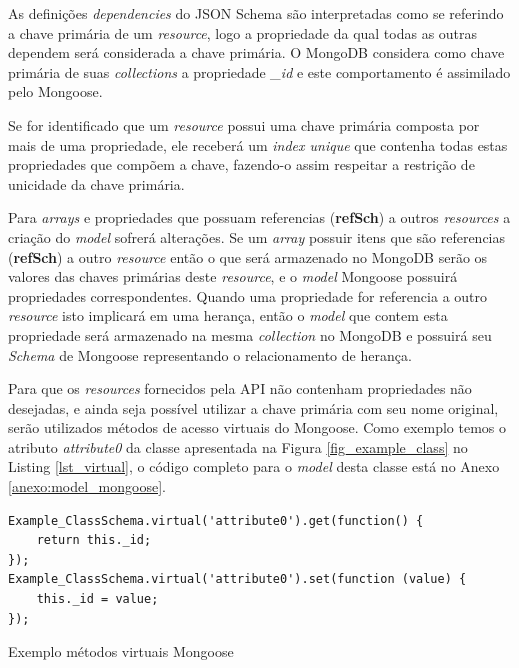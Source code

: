As definições \textit{dependencies} do JSON Schema são interpretadas como se referindo a chave primária de um \textit{resource}, logo a propriedade da qual todas as outras dependem será considerada a chave primária. O MongoDB considera como chave primária de suas \textit{collections} a propriedade \textit{\_id} e este comportamento é assimilado pelo Mongoose.

Se for identificado que um \textit{resource} possui uma chave primária composta por mais de uma propriedade, ele receberá um \textit{index unique} que contenha todas estas propriedades que compõem a chave, fazendo-o assim respeitar a restrição de unicidade da chave primária.

Para \textit{arrays} e propriedades que possuam referencias (\textbf{refSch}) a outros \textit{resources} a criação do \textit{model} sofrerá alterações. Se um \textit{array} possuir itens que são referencias (\textbf{refSch}) a outro \textit{resource} então o que será armazenado no MongoDB serão os valores das chaves primárias deste \textit{resource}, e o \textit{model} Mongoose possuirá propriedades correspondentes. Quando uma propriedade for referencia a outro \textit{resource} isto implicará em uma herança, então o \textit{model} que contem esta propriedade será armazenado na mesma \textit{collection} no MongoDB e possuirá seu \textit{Schema} de Mongoose representando o relacionamento de herança.

Para que os \textit{resources} fornecidos pela API não contenham propriedades não desejadas, e ainda seja possível utilizar a chave primária com seu nome original, serão utilizados métodos de acesso virtuais do Mongoose. Como exemplo temos o atributo \textit{attribute0} da classe apresentada na Figura \ref{fig_example_class} no Listing \ref{lst_virtual}, o código completo para o \textit{model} desta classe está no Anexo \ref{anexo:model_mongoose}.

\begin{listing}
\begin{verbatim}               
Example_ClassSchema.virtual('attribute0').get(function() {
    return this._id;
});
Example_ClassSchema.virtual('attribute0').set(function (value) {
    this._id = value;
});
\end{verbatim}
\caption{Exemplo métodos virtuais Mongoose}
\label{lst_virtual}
\end{listing}

